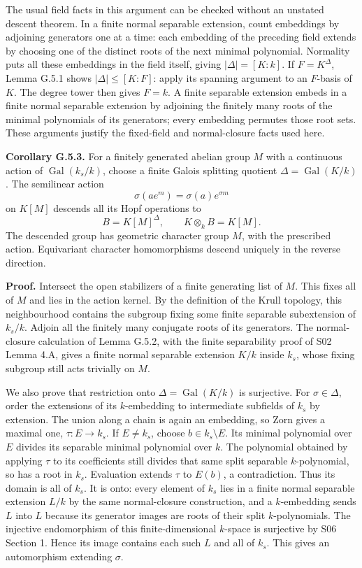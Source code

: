 \documentclass[11pt,a4paper,openany]{report}
\begin{document}
The usual field facts in this argument can be checked without an unstated descent theorem. In a finite normal separable extension, count embeddings by adjoining generators one at a time: each embedding of the preceding field extends by choosing one of the distinct roots of the next minimal polynomial. Normality puts all these embeddings in the field itself, giving \(|\Delta|=[K:k]\). If \(F=K^\Delta\), Lemma G.5.1 shows \(|\Delta|\leq[K:F]\): apply its spanning argument to an \(F\)-basis of \(K\). The degree tower then gives \(F=k\). A finite separable extension embeds in a finite normal separable extension by adjoining the finitely many roots of the minimal polynomials of its generators; every embedding permutes those root sets. These arguments justify the fixed-field and normal-closure facts used here.

\textbf{Corollary G.5.3.} For a finitely generated abelian group \(M\) with a continuous action of \(\operatorname{Gal}(k_s/k)\), choose a finite Galois splitting quotient \(\Delta=\operatorname{Gal}(K/k)\). The semilinear action \[
\sigma(ae^m)=\sigma(a)e^{\sigma m}
\] on \(K[M]\) descends all its Hopf operations to \[
B=K[M]^\Delta,\qquad K\otimes_kB=K[M].
\] The descended group has geometric character group \(M\), with the prescribed action. Equivariant character homomorphisms descend uniquely in the reverse direction.

\textbf{Proof.} Intersect the open stabilizers of a finite generating list of \(M\). This fixes all of \(M\) and lies in the action kernel. By the definition of the Krull topology, this neighbourhood contains the subgroup fixing some finite separable subextension of \(k_s/k\). Adjoin all the finitely many conjugate roots of its generators. The normal-closure calculation of Lemma G.5.2, with the finite separability proof of S02 Lemma 4.A, gives a finite normal separable extension \(K/k\) inside \(k_s\), whose fixing subgroup still acts trivially on \(M\).

We also prove that restriction onto \(\Delta=\operatorname{Gal}(K/k)\) is surjective. For \(\sigma\in\Delta\), order the extensions of its \(k\)-embedding to intermediate subfields of \(k_s\) by extension. The union along a chain is again an embedding, so Zorn gives a maximal one, \(\tau:E\to k_s\). If \(E\ne k_s\), choose \(b\in k_s\setminus E\). Its minimal polynomial over \(E\) divides its separable minimal polynomial over \(k\). The polynomial obtained by applying \(\tau\) to its coefficients still divides that same split separable \(k\)-polynomial, so has a root in \(k_s\). Evaluation extends \(\tau\) to \(E(b)\), a contradiction. Thus its domain is all of \(k_s\). It is onto: every element of \(k_s\) lies in a finite normal separable extension \(L/k\) by the same normal-closure construction, and a \(k\)-embedding sends \(L\) into \(L\) because its generator images are roots of their split \(k\)-polynomials. The injective endomorphism of this finite-dimensional \(k\)-space is surjective by S06 Section 1. Hence its image contains each such \(L\) and all of \(k_s\). This gives an automorphism extending \(\sigma\).
\end{document}
